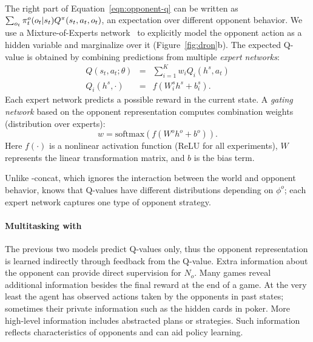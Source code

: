 \paragraph{\dronmoe}

The right part of Equation~\ref{eqn:opponent-q} can be written as
$\sum_{o_t} \pi^o_t(o_t|s_t) Q^\pi(s_t,a_t,o_t)$, an expectation
over different opponent behavior.  We use a
Mixture-of-Experts network~\cite{moe} to explicitly model the opponent
action as a hidden variable and marginalize over it
(Figure~\ref{fig:dron}b).  The expected Q-value is obtained by
combining predictions from multiple \emph{expert networks}:
\begin{eqnarray*}
Q(s_t, a_t; \theta) &=& \sum_{i=1}^K w_i Q_i(h^s, a_t) \\
Q_i(h^s, \cdot) &=& f(W_i^s h^s + b_i^s) .
\end{eqnarray*}
Each expert network predicts a possible reward in the current state.
A \emph{gating network} based on the opponent representation computes combination weights (distribution over experts):
\begin{equation*}
w = \mbox{softmax}\left(f(W^o h^o + b^o)\right).
\end{equation*}
Here $f(\cdot)$ is a nonlinear activation function (ReLU for
all experiments),
$W$ represents the linear transformation matrix, and $b$ is the bias term.

Unlike \dron{}-concat, which ignores the interaction between the world and
opponent behavior, \dronmoe{} knows that Q-values have different distributions
depending on $\phi^o$; each expert network captures one type of
opponent strategy.

\paragraph{Multitasking with \dron{}}





The previous two models
predict Q-values only, thus the opponent representation is learned
indirectly through feedback from the Q-value.  Extra information
about the opponent can provide direct supervision for $N_o$.
Many games reveal additional information besides the
final reward at the end of a game.  At the very least the agent has
observed actions taken by the opponents in past states; sometimes
their private information such as the hidden cards in poker.  More high-level
information includes abstracted plans or strategies.
Such information reflects characteristics of opponents and
can aid policy learning.

